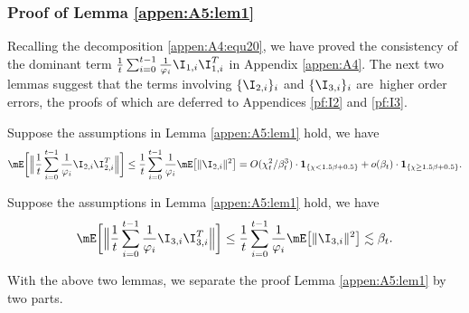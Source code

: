 \subsubsection{Proof of Lemma \ref{appen:A5:lem1}}\label{pf:samplecov}

Recalling the decomposition \eqref{appen:A4:equ20}, we have proved the consistency of the dominant term $\frac{1}{t}\sum_{i=0}^{t-1}\frac{1}{\varphi_i}\I_{1,i}\I_{1,i}^T$ in Appendix \ref{appen:A4}. The next two lemmas suggest that the terms involving $\{\I_{2,i}\}_i$ and $\{\I_{3,i}\}_i$ are~higher order errors, the proofs of which are deferred to Appendices \ref{pf:I2} and \ref{pf:I3}.

\begin{lemma}\label{appen:A5:lem3}

Suppose the assumptions in Lemma \ref{appen:A5:lem1} hold, we have
\begin{equation*}
\mE\bigg[\Big\|\frac{1}{t}\sum_{i=0}^{t-1}\frac{1}{\varphi_i}\I_{2,i}\I_{2,i}^T\Big\|\bigg]\leq\frac{1}{t}\sum_{i=0}^{t-1}\frac{1}{\varphi_i}\mE\big[\|\I_{2,i}\|^2\big] =O(\chi_t^2/\beta_t^3)\cdot \mathbf{1}_{\{\chi<1.5\beta+0.5\}} + o(\beta_t)\cdot \mathbf{1}_{\{\chi\geq 1.5\beta+0.5\}}.
\end{equation*}
\end{lemma}

\begin{lemma}\label{appen:A5:lem4}

Suppose the assumptions in Lemma \ref{appen:A5:lem1} hold, we have
\begin{equation*}
\mE\bigg[\Big\|\frac{1}{t}\sum_{i=0}^{t-1}\frac{1}{\varphi_i}\I_{3,i}\I_{3,i}^T\Big\|\bigg]\leq\frac{1}{t} \sum_{i=0}^{t-1} \frac{1}{\varphi_i} \mE\big[\|\I_{3, i}\|^2\big] \lesssim \beta_t.
\end{equation*}
\end{lemma}

With the above two lemmas, we separate the proof Lemma \ref{appen:A5:lem1} by two parts.

